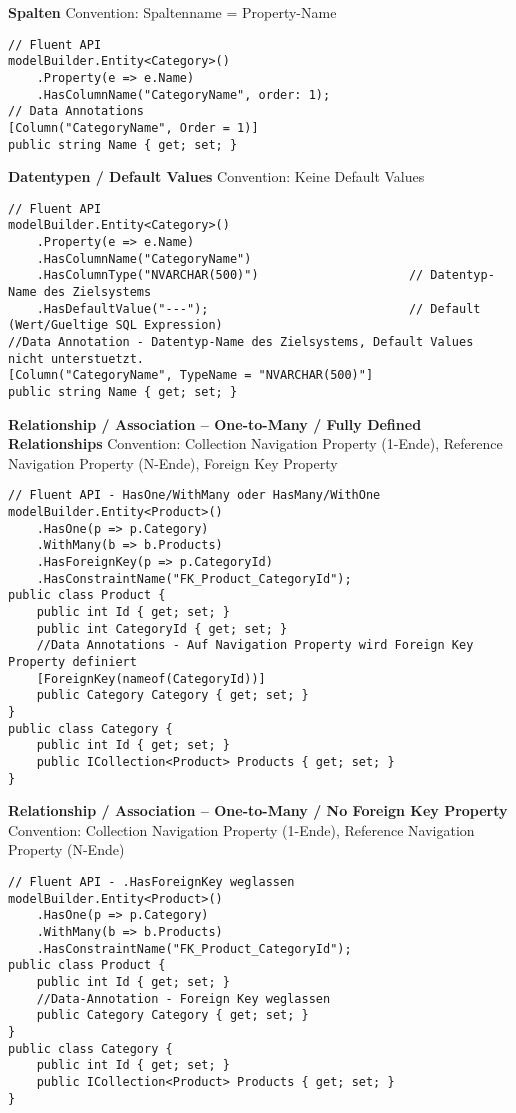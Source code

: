 \textbf{Spalten} 
Convention: Spaltenname = Property-Name
\begin{lstlisting}
// Fluent API
modelBuilder.Entity<Category>()                         
    .Property(e => e.Name)
    .HasColumnName("CategoryName", order: 1);
// Data Annotations
[Column("CategoryName", Order = 1)]                     
public string Name { get; set; }
\end{lstlisting}

\textbf{Datentypen / Default Values}
Convention: Keine Default Values
\begin{lstlisting}
// Fluent API
modelBuilder.Entity<Category>()                         
    .Property(e => e.Name)
    .HasColumnName("CategoryName")
    .HasColumnType("NVARCHAR(500)")                     // Datentyp-Name des Zielsystems
    .HasDefaultValue("---");                            // Default (Wert/Gueltige SQL Expression)
//Data Annotation - Datentyp-Name des Zielsystems, Default Values nicht unterstuetzt.
[Column("CategoryName", TypeName = "NVARCHAR(500)"] 
public string Name { get; set; }
\end{lstlisting}

\textbf{Relationship / Association – One-to-Many / Fully Defined Relationships} 
Convention: Collection Navigation Property (1-Ende), Reference Navigation Property (N-Ende), Foreign Key Property
\begin{lstlisting}
// Fluent API - HasOne/WithMany oder HasMany/WithOne
modelBuilder.Entity<Product>()
    .HasOne(p => p.Category)                            
    .WithMany(b => b.Products)
    .HasForeignKey(p => p.CategoryId)
    .HasConstraintName("FK_Product_CategoryId");
public class Product {
    public int Id { get; set; }
    public int CategoryId { get; set; }
    //Data Annotations - Auf Navigation Property wird Foreign Key Property definiert
    [ForeignKey(nameof(CategoryId))]                        
    public Category Category { get; set; }
}
public class Category {
    public int Id { get; set; }
    public ICollection<Product> Products { get; set; }
}
\end{lstlisting}

\textbf{Relationship / Association – One-to-Many / No Foreign Key Property} 
Convention: Collection Navigation Property (1-Ende), Reference Navigation Property (N-Ende)
\begin{lstlisting}
// Fluent API - .HasForeignKey weglassen
modelBuilder.Entity<Product>()
    .HasOne(p => p.Category)
    .WithMany(b => b.Products)                          
    .HasConstraintName("FK_Product_CategoryId");
public class Product {
    public int Id { get; set; }
    //Data-Annotation - Foreign Key weglassen
    public Category Category { get; set; }              
}
public class Category {
    public int Id { get; set; }
    public ICollection<Product> Products { get; set; }
}
\end{lstlisting}

